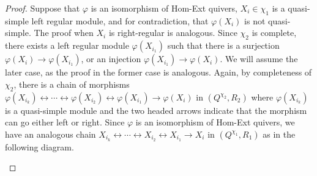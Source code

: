 \documentclass[10pt,a4paper]{amsart}
\begin{document}
\begin{proof}
    Suppose that $\varphi$ is an isomorphism of Hom-Ext quivers, $X_i\in \chi_1$ is a quasi-simple left regular module, and for contradiction, that $\varphi(X_i)$ is not quasi-simple. The proof when $X_i$ is right-regular is analogous. Since $\chi_2$ is complete, there exists a left regular module $\varphi(X_{i_1})$ such that there is a surjection $\varphi(X_i) \rightarrow \varphi(X_{i_1})$, or an injection $\varphi(X_{i_1}) \rightarrow \varphi(X_i)$. We will assume the later case, as the proof in the former case is analogous. Again, by completeness of $\chi_2$, there is a chain of morphisms $\varphi(X_{i_k}) \leftrightarrow \cdots \leftrightarrow \varphi(X_{i_2}) \leftrightarrow \varphi(X_{i_1}) \rightarrow \varphi(X_i)$ in $(Q^{\chi_2},R_2)$ where $\varphi(X_{i_k})$ is a quasi-simple module and the two headed arrows indicate that the morphism can go either left or right. Since $\varphi$ is an isomorphism of Hom-Ext quivers, we have an analogous chain $X_{i_k} \leftrightarrow \cdots \leftrightarrow X_{i_2} \leftrightarrow X_{i_1} \rightarrow X_i$  in $(Q^{\chi_1},R_1)$ as in the following diagram.

\begin{center}



\begin{tikzpicture}[x=0.75pt,y=0.75pt,yscale=-1,xscale=1]


\end{tikzpicture}
\end{center}
\end{proof}
\end{document}
